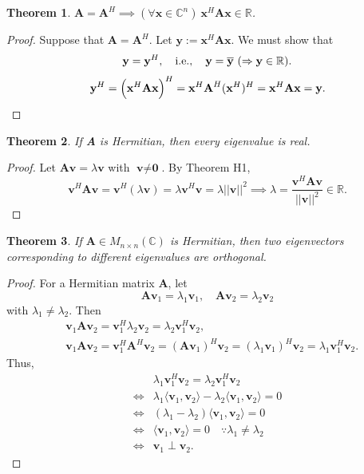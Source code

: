 \documentclass[12pt,openany]{book}
\newtheorem{theorem}{Theorem}[chapter]
\theoremstyle{definition}
\newcommand{\R}{\mathbb{R}}
\newcommand{\C}{\mathbb{C}}
\newcommand{\ie}{\textnormal{i.e.}}
\newcommand{\by}{\times}
\newcommand{\inner}[1]{\langle #1\rangle}
\newcommand{\norms}[1]{|| #1||}
\newcommand{\conjugate}[1]{\overline{#1}}
\renewcommand{\vec}[1]{\textbf{#1}}
\begin{document}
	\newpage
	\begin{tcolorbox}[colframe=thmcolor,title={\color{white}\bf H1}]
		\begin{theorem}
			\(\textbf{A}=\textbf{A}^H\implies (\forall\vec{x}\in\C^n)\  \vec{x}^H\textbf{A}\vec{x}\in\R\).
		\end{theorem}
	\end{tcolorbox}
	\begin{proof}
		Suppose that \(\textbf{A}=\textbf{A}^H\). Let \(\textbf{y}:=\textbf{x}^H\textbf{A}\textbf{x}\). We must show that \[
		\textbf{y}=\textbf{y}^H,\quad\ie,\quad \textbf{y}=\conjugate{\textbf{y}}\ (\Rightarrow\textbf{y}\in\R).
		\] \[
		\textbf{y}^H=\del{\vec{x}^H\textbf{A}\vec{x}}^H=\vec{x}^H\textbf{A}^H(\vec{x}^H)^H=\textbf{x}^H\textbf{A}\vec{x}=\vec{y}.
		\]
	\end{proof}
	\vspace{4pt}
	\begin{tcolorbox}[colframe=thmcolor,title={\color{white}\bf H2}]
		\begin{theorem}
			If \textbf{A} is Hermitian, then every eigenvalue is real.
		\end{theorem}
	\end{tcolorbox}
	\begin{proof}
		Let \(\textbf{A}\vec{v}=\lambda\vec{v}\) with $\vec{v}\neq\textbf{0}$. By Theorem H1, \[
		\vec{v}^H\textbf{A}\vec{v}=\vec{v}^H(\lambda\vec{v})=\lambda\vec{v}^H\vec{v}=\lambda\norms{\vec{v}}^2\implies\lambda=\frac{\vec{v}^H\textbf{A}\vec{v}}{\norms{\vec{v}}^2}\in\R.
		\]
	\end{proof}
	\vspace{4pt}
	\begin{tcolorbox}[colframe=thmcolor,title={\color{white}\bf H3}]
		\begin{theorem}
			If \(\textbf{A}\in M_{n\by n}(\C)\) is Hermitian, then two eigenvectors corresponding to different eigenvalues are orthogonal.
		\end{theorem}
	\end{tcolorbox}
	\begin{proof}
		For a Hermitian matrix \(\textbf{A}\), let \[
		\textbf{A}\vec{v}_1=\lambda_1\vec{v}_1,\quad\textbf{A}\vec{v}_2=\lambda_2\vec{v}_2
		\] with \(\lambda_1\neq\lambda_2\). Then 
		\begin{align*}
			&\vec{v}_1\textbf{A}\vec{v}_2=\vec{v}_1^H\lambda_2\vec{v}_2=\lambda_2\vec{v}_1^H\vec{v}_2,\\
			&\vec{v}_1\textbf{A}\vec{v}_2=\vec{v}_1^H\textbf{A}^H\vec{v}_2=(\textbf{A}\vec{v}_1)^H\vec{v}_2=(\lambda_1\vec{v}_1)^H\vec{v}_2=\lambda_1\vec{v}_1^H\vec{v}_2.
		\end{align*} Thus, 
		\begin{align*}
			&\lambda_1\vec{v}_1^H\vec{v}_2=\lambda_2\vec{v}_1^H\vec{v}_2\\
			\iff&\lambda_1\inner{\vec{v}_1,\vec{v}_2}-\lambda_2\inner{\vec{v}_1,\vec{v}_2}=0\\
			\iff&(\lambda_1-\lambda_2)\inner{\vec{v}_1,\vec{v}_2}=0\\
			\iff&\inner{\vec{v}_1,\vec{v}_2}=0\quad\because\lambda_1\neq\lambda_2\\
			\iff&\vec{v}_1\perp\vec{v}_2.
		\end{align*}
	\end{proof}
	\newpage
\end{document}
